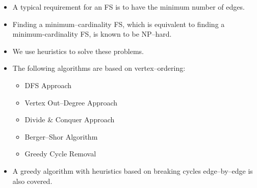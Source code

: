 \documentclass{beamer}
\begin{document}
\begin{frame}
        

    \begin{itemize}

        \item A typical requirement for an FS is to have the minimum number of edges.
        \item Finding a minimum–cardinality FS, which is equivalent to finding a minimum-cardinality FS, is known to be NP–hard.
        \item We use heuristics to solve these problems.
        \item The following algorithms are based on vertex–ordering:
            
            \begin{itemize}
                
                \item DFS Approach
                \item Vertex Out–Degree Approach
                \item Divide \& Conquer Approach
                \item Berger–Shor Algorithm
                \item Greedy Cycle Removal

            \end{itemize}

        \item A greedy algorithm with heuristics based on breaking cycles edge–by–edge is also covered.

    \end{itemize}
        

\end{frame}


\end{document}
